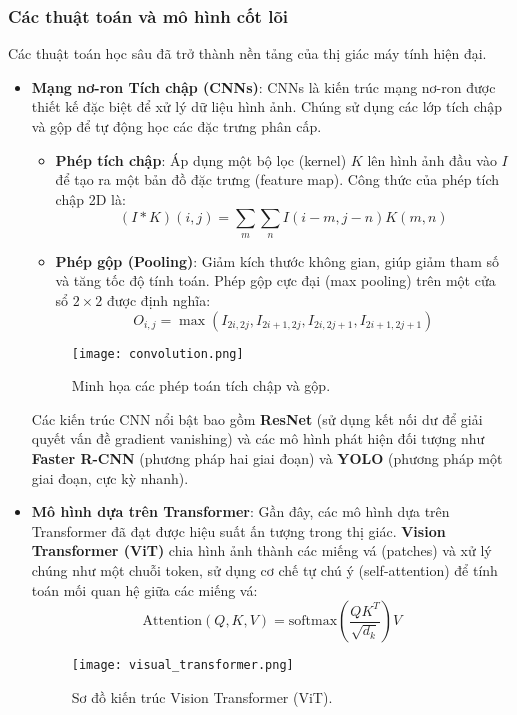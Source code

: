 \subsubsection{Các thuật toán và mô hình cốt lõi}
Các thuật toán học sâu đã trở thành nền tảng của thị giác máy tính hiện đại.
\begin{itemize}
    \item \textbf{Mạng nơ-ron Tích chập (CNNs)}:
    CNNs là kiến trúc mạng nơ-ron được thiết kế đặc biệt để xử lý dữ liệu hình ảnh. Chúng sử dụng các lớp tích chập và gộp để tự động học các đặc trưng phân cấp.
    \begin{itemize}
        \item \textbf{Phép tích chập}: Áp dụng một bộ lọc (kernel) $K$ lên hình ảnh đầu vào $I$ để tạo ra một bản đồ đặc trưng (feature map). Công thức của phép tích chập 2D là:
        \begin{equation}
        (I * K)(i, j) = \sum_{m} \sum_{n} I(i-m, j-n) K(m, n)
        \label{eq:convolution_full}
        \end{equation}
        \item \textbf{Phép gộp (Pooling)}: Giảm kích thước không gian, giúp giảm tham số và tăng tốc độ tính toán. Phép gộp cực đại (max pooling) trên một cửa sổ $2 \times 2$ được định nghĩa:
        \begin{equation}
        O_{i,j} = \max \left( I_{2i, 2j}, I_{2i+1, 2j}, I_{2i, 2j+1}, I_{2i+1, 2j+1} \right)
        \label{eq:max_pooling_full}
        \end{equation}
    \end{itemize}
    \begin{figure}[h]
        \centering
        \texttt{[image: convolution.png]}
        \caption{Minh họa các phép toán tích chập và gộp.}
        \label{fig:cnn_ops}
    \end{figure}
    Các kiến trúc CNN nổi bật bao gồm \textbf{ResNet} \cite{he2016deep} (sử dụng kết nối dư để giải quyết vấn đề gradient vanishing) và các mô hình phát hiện đối tượng như \textbf{Faster R-CNN} \cite{ren2015faster} (phương pháp hai giai đoạn) và \textbf{YOLO} \cite{redmon2016you} (phương pháp một giai đoạn, cực kỳ nhanh).

    \item \textbf{Mô hình dựa trên Transformer}:
    Gần đây, các mô hình dựa trên Transformer đã đạt được hiệu suất ấn tượng trong thị giác. \textbf{Vision Transformer (ViT)} \cite{dosovitskiy2021image} chia hình ảnh thành các miếng vá (patches) và xử lý chúng như một chuỗi token, sử dụng cơ chế tự chú ý (self-attention) để tính toán mối quan hệ giữa các miếng vá:
    \begin{equation}
    \text{Attention}(Q, K, V) = \text{softmax}\left(\frac{QK^T}{\sqrt{d_k}}\right)V
    \label{eq:attention_full}
    \end{equation}
    \begin{figure}[h]
        \centering
        \texttt{[image: visual\_transformer.png]}
        \caption{Sơ đồ kiến trúc Vision Transformer (ViT).}
        \label{fig:vit_arch}
    \end{figure}
\end{itemize}

